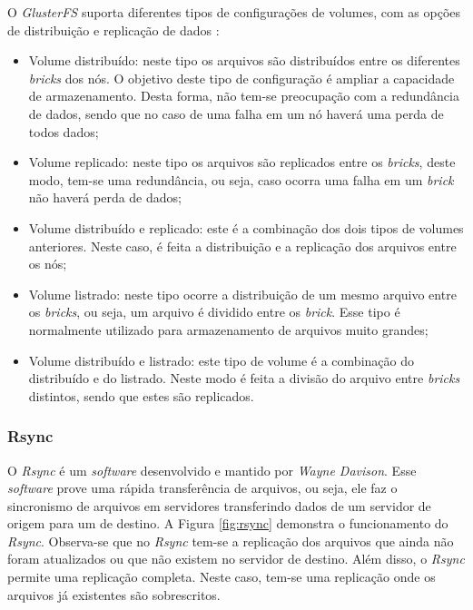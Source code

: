 O \textit{GlusterFS} suporta diferentes tipos de configurações de volumes, com as opções de distribuição e replicação de dados \cite{glusterfs}:
\begin{itemize}
 \item Volume distribuído: neste tipo os arquivos são distribuídos entre os diferentes \textit{bricks} dos nós. O objetivo deste tipo de 
 configuração é ampliar a capacidade de armazenamento. Desta forma, não tem-se preocupação com a redundância de dados, sendo que no caso de uma
 falha em um nó haverá uma perda de todos dados;
 \item Volume replicado: neste tipo os arquivos são replicados entre os \textit{bricks}, deste modo, tem-se uma redundância, ou seja, caso ocorra
 uma falha em um \textit{brick} não haverá perda de dados;
 \item Volume distribuído e replicado: este é a combinação dos dois tipos de volumes anteriores. Neste caso, é feita a distribuição 
 e a replicação dos arquivos entre os nós;
 \item Volume listrado: neste tipo ocorre a distribuição de um mesmo arquivo entre os \textit{bricks}, ou seja, um arquivo é dividido entre os
 \textit{brick}. Esse tipo é normalmente utilizado para armazenamento de arquivos muito grandes;
 \item Volume distribuído e listrado: este tipo de volume é a combinação do distribuído e do listrado. Neste modo é feita a divisão do arquivo 
 entre \textit{bricks} distintos, sendo que estes são replicados.
\end{itemize}

\subsubsection{Rsync}
\label{section:rsync}
O \textit{Rsync} \cite{rsync} é um \textit{software} desenvolvido e mantido por \textit{Wayne Davison}. Esse \textit{software} prove uma rápida
transferência de arquivos, ou seja, ele faz o sincronismo de arquivos em servidores transferindo dados de um servidor de origem para um de destino.
A Figura \ref{fig:rsync} demonstra o funcionamento do \textit{Rsync}. Observa-se que no \textit{Rsync} tem-se a replicação dos arquivos que
ainda não foram atualizados ou que não existem no servidor de destino. Além disso, o \textit{Rsync} permite uma replicação completa. Neste caso,
tem-se uma replicação onde os arquivos já existentes são sobrescritos.


